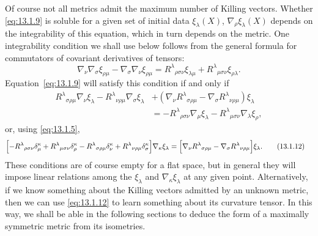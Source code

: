 Of course not all metrics admit the maximum number of Killing vectors.
Whether \eqref{eq:13.1.9} is soluble for a given set of initial data
\(\xi_\lambda(X)\), \(\nabla_\rho\xi_\lambda(X)\) depends on the
integrability of this equation, which in turn depends on the metric. One
integrability condition we shall use below follows from the general formula
for commutators of covariant derivatives of tensors:
\[
  \nabla_\nu\nabla_\sigma\xi_{\rho\mu}
  -\nabla_\sigma\nabla_\nu\xi_{\rho\mu}
  =
  R^\lambda{}_{\rho\sigma\nu}\xi_{\lambda\mu}
  +R^\lambda{}_{\mu\sigma\nu}\xi_{\rho\lambda}.
\]
Equation~\eqref{eq:13.1.9} will satisfy this condition if and only if
\begin{align*}
  R^\lambda{}_{\sigma\rho\mu}\nabla_\nu\xi_\lambda
  -R^\lambda{}_{\nu\rho\mu}\nabla_\sigma\xi_\lambda
  &+
  \left(
    \nabla_\nu R^\lambda{}_{\sigma\rho\mu}
    -\nabla_\sigma R^\lambda{}_{\nu\rho\mu}
  \right)\xi_\lambda
  \\
  &=
  -R^\lambda{}_{\rho\sigma\nu}\nabla_\mu\xi_\lambda
  -R^\lambda{}_{\mu\sigma\nu}\nabla_\lambda\xi_\rho,
\end{align*}
or, using \eqref{eq:13.1.5},
\begin{align}
  \Bigl[
    -R^\lambda{}_{\rho\sigma\nu}\delta_\mu^\kappa
    +R^\lambda{}_{\mu\sigma\nu}\delta_\rho^\kappa
    -R^\lambda{}_{\sigma\rho\mu}\delta_\nu^\kappa
    +R^\lambda{}_{\nu\rho\mu}\delta_\sigma^\kappa
  \Bigr]\nabla_\kappa\xi_\lambda
  &=
  \Bigl[
    \nabla_\nu R^\lambda{}_{\sigma\rho\mu}
    -\nabla_\sigma R^\lambda{}_{\nu\rho\mu}
  \Bigr]\xi_\lambda.
  \tag{13.1.12}\label{eq:13.1.12}
\end{align}
These conditions are of course empty for a flat space, but in general they
will impose linear relations among the \(\xi_\lambda\) and
\(\nabla_\kappa\xi_\lambda\) at any given point. Alternatively, if we know
something about the Killing vectors admitted by an unknown metric, then we can
use \eqref{eq:13.1.12} to learn something about its curvature tensor. In this
way, we shall be able in the following sections to deduce the form of a
maximally symmetric metric from its isometries.

